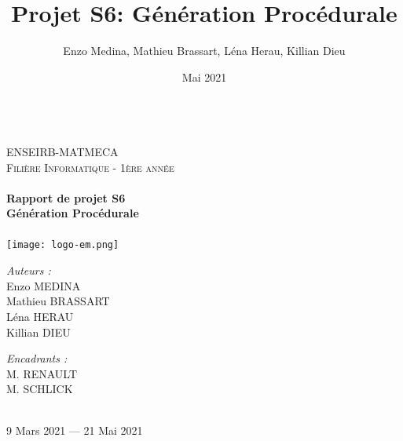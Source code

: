 \documentclass[a4paper]{article}
\title{Projet S6: Génération Procédurale}
\author{Enzo Medina, Mathieu Brassart, Léna Herau, Killian Dieu}
\date{Mai 2021}
\begin{document}
\begin{titlepage}
    \begin{sffamily}
    \begin{center}
    
    ~\\[1.5cm]
    \textsc{\LARGE ENSEIRB-MATMECA}\\[1.5cm]
    
    \textsc{\Large Filière Informatique - 1ère année}\\[2cm]
    
    
        \hrulefill \\[0.4cm]
    { \Huge \bfseries Rapport de projet S6 \\[0.4cm] }
    { \huge \bfseries Génération Procédurale \\[0.4cm] }
     \hrulefill \\[2cm]
     
     \texttt{[image: logo-em.png]} \\[1cm]
     
    \begin{minipage}{0.4\textwidth}
      \begin{flushleft} \large
         \emph{Auteurs :} \\
        Enzo MEDINA\\
        Mathieu BRASSART \\
        Léna HERAU \\
        Killian DIEU \\
      \end{flushleft}
    \end{minipage}
    \begin{minipage}{0.4\textwidth}
      \begin{flushright} \large
        \emph{Encadrants :} \\
        M. RENAULT\\
        M. SCHLICK \\
      \end{flushright}
    \end{minipage}
    
     ~\\[1.5cm]
    {\large 9 Mars 2021 — 21 Mai 2021}
    
    \end{center}
    \end{sffamily}
\end{titlepage}


\tableofcontents
\end{document}
